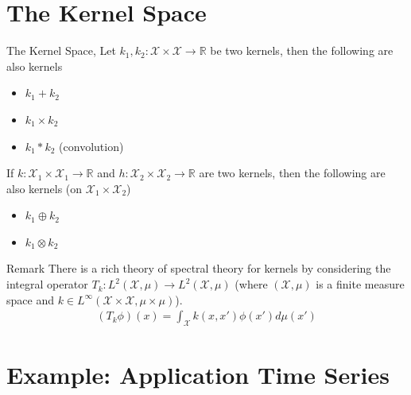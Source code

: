 \documentclass[10pt]{beamer}
\begin{document}
\section{The Kernel Space}

\begin{frame}{The Kernel Space}{\cite{ROERGA}, \cite[Chapter 4]{RW05}}
Let $k_1, k_2: \mathcal{X}\times\mathcal{X}\longrightarrow \mathbb{R}$ be two kernels, then the following are also kernels 
\begin{itemize}
\item $k_1 + k_2$ 
\item $k_1 \times k_2$
\item $k_1*k_2$ (convolution)
\end{itemize}
If $k: \mathcal{X}_1\times\mathcal{X}_1\longrightarrow \mathbb{R}$ and $h: \mathcal{X}_2\times\mathcal{X}_2\longrightarrow \mathbb{R}$ are two kernels, then the following are also kernels (on $\mathcal{X}_1 \times \mathcal{X}_2$)
\begin{itemize}
\item $k_1 \oplus k_2$ 
\item $k_1 \otimes k_2$
\end{itemize}
\begin{block}{Remark}
There is a rich theory of spectral theory for kernels by considering the integral operator $T_k : L^2(\mathcal{X}, \mu) \longrightarrow L^2(\mathcal{X}, \mu)$ (where $(\mathcal{X}, \mu)$ is a finite measure space and $k\in L^{\infty}(\mathcal{X}\times \mathcal{X} , \mu\times\mu)$). 
\begin{align*}
(T_k\phi)(x) = \int_{\mathcal{X}} k(x, x')\phi(x') d\mu(x')
\end{align*}
\end{block}
\end{frame}

\section{Example: Application Time Series}
\end{document}
